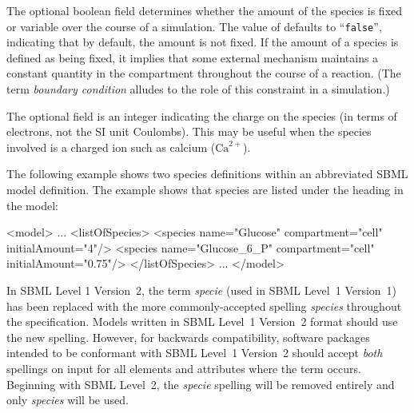 \documentclass[10pt]{cekarticle}
\newcommand{\changed}[1]{\textcolor{BrickRed}{#1}}
\newenvironment{blockChanged}{\color{BrickRed}}{}
\begin{document}
The optional boolean field  determines whether
the amount of the \changed{species} is fixed or variable over the course of
a simulation.  The value of  defaults to
``\texttt{false}'', indicating that by default, the amount is not fixed.
\changed{If the amount of a species is defined as being fixed, it
implies that some external mechanism maintains a constant quantity in the
compartment throughout the course of a reaction.  (The term \emph{boundary
  condition} alludes to the role of this constraint in a simulation.)}

The optional field  is an integer indicating the charge on
the species (in terms of electrons, not the SI unit Coulombs).  This may be
useful when the \changed{species} involved is a charged ion such as calcium
(\changed{$\text{Ca}^{2+}$}).

The following example shows two \changed{species} definitions within an
abbreviated SBML model definition.  The example shows that species are
listed under the heading  in the model:
\begin{example}
<model>
    ...
    <listOfSpecies>
        <species name="Glucose" compartment="cell" initialAmount="4"/>
        <species name="Glucose_6_P" compartment="cell" initialAmount="0.75"/>
    </listOfSpecies>
    ...
</model>
\end{example}


\begin{blockChanged}
  In SBML Level 1 Version~2, the term \emph{specie} (used in SBML Level~1
  Version~1) has been replaced with the more commonly-accepted spelling
  \emph{species} throughout the specification.  Models written in SBML
  Level~1 Version~2 format should use the new spelling.  However, for
  backwards compatibility, software packages intended to be conformant with
  SBML Level~1 Version~2 should accept \emph{both} spellings on input for
  all elements and attributes where the term occurs.  Beginning with SBML
  Level~2, the \emph{specie} spelling will be removed entirely and only
  \emph{species} will be used.
\end{blockChanged}
\end{document}
